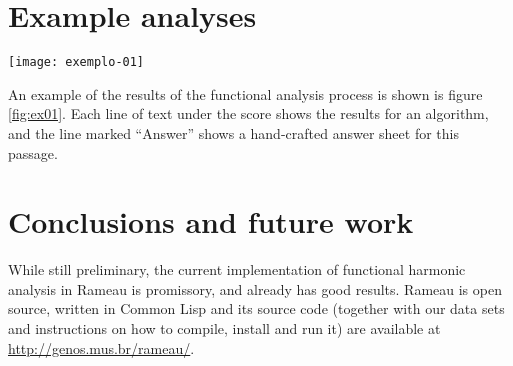 \section{Example analyses}
\label{sec:example-analyses}

\begin{figure*}[t]
  \centering
  \texttt{[image: exemplo-01]}
  \caption{An excerpt of the analysis of Bach chorale \#20.}
  \label{fig:ex01}
\end{figure*}

An example of the results of the functional analysis process is shown
is figure \ref{fig:ex01}. Each line of text under the score shows the
results for an algorithm, and the line marked ``Answer'' shows a
hand-crafted answer sheet for this passage.

\section{Conclusions and future work}
\label{sec:concl-future-work}

 While still preliminary,
the current implementation of functional harmonic analysis in Rameau
is promissory, and already has good results. Rameau is open source,
written in Common Lisp and its source code (together with our data
sets and instructions on how to compile, install and run it)
 are available at
\url{http://genos.mus.br/rameau/}.

